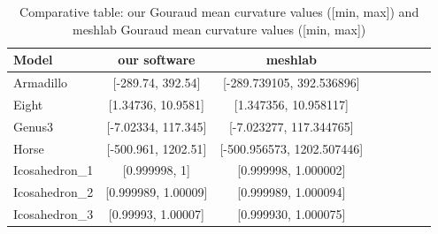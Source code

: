 \begin{table}[!h]%
    \centering
\begin{tabular}{l*{6}{c}r}
    \centering
    Model              & our software &  meshlab \\
    \hline
    Armadillo          & [-289.74, 392.54] & [-289.739105, 392.536896] \\
    Eight              & [1.34736, 10.9581] & [1.347356, 10.958117] \\
    Genus3             & [-7.02334, 117.345] & [-7.023277, 117.344765]  \\
    Horse              & [-500.961, 1202.51] &  [-500.956573, 1202.507446]\\
    Icosahedron\_1      &  [0.999998, 1] & [0.999998, 1.000002] \\
    Icosahedron\_2      &  [0.999989, 1.00009] & [0.999989, 1.000094] \\
    Icosahedron\_3      & [0.99993, 1.00007] &  [0.999930, 1.000075]
\end{tabular}
\caption{Comparative table: our Gouraud mean curvature values ([min, max]) and meshlab Gouraud mean curvature values ([min, max])}
\label{table:table-mean-meshlab}
\end{table}


